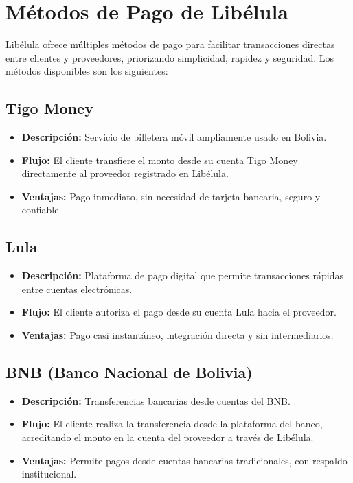 \section{Métodos de Pago de Libélula}
    Libélula ofrece múltiples métodos de pago para facilitar transacciones directas entre clientes y proveedores, priorizando simplicidad, 
	rapidez y seguridad. Los métodos disponibles son los siguientes:\par
	\subsection{Tigo Money}
		\begin{itemize}
			\item \textbf{Descripción:} Servicio de billetera móvil ampliamente usado en Bolivia.
			\item \textbf{Flujo:} El cliente transfiere el monto desde su cuenta Tigo Money directamente al proveedor registrado en Libélula.
			\item \textbf{Ventajas:} Pago inmediato, sin necesidad de tarjeta bancaria, seguro y confiable.
		\end{itemize}

	\subsection{Lula}
		\begin{itemize}
			\item \textbf{Descripción:} Plataforma de pago digital que permite transacciones rápidas entre cuentas electrónicas.
			\item \textbf{Flujo:} El cliente autoriza el pago desde su cuenta Lula hacia el proveedor.
			\item \textbf{Ventajas:} Pago casi instantáneo, integración directa y sin intermediarios.
		\end{itemize}

	\subsection{BNB (Banco Nacional de Bolivia)}
		\begin{itemize}
			\item \textbf{Descripción:} Transferencias bancarias desde cuentas del BNB.
			\item \textbf{Flujo:} El cliente realiza la transferencia desde la plataforma del banco, acreditando el monto en la cuenta del proveedor a través de Libélula.
			\item \textbf{Ventajas:} Permite pagos desde cuentas bancarias tradicionales, con respaldo institucional.
		\end{itemize}

